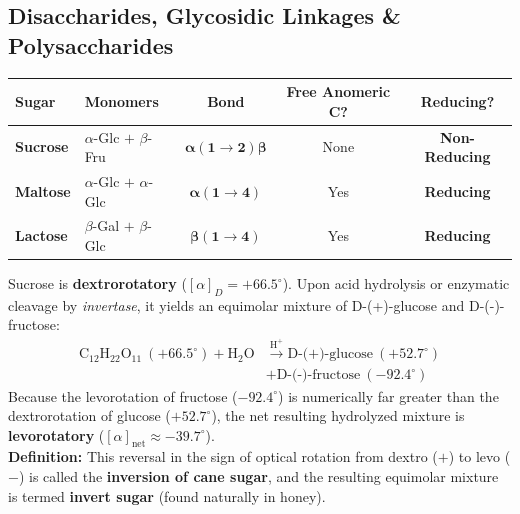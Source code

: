 \documentclass[10pt,twoside,openright]{book}
\begin{document}
\subsection{Disaccharides, Glycosidic Linkages \& Polysaccharides}

\begin{formulabox}
{\fontsize{7.5pt}{9.0pt}\selectfont\setlength{\tabcolsep}{1.5pt}
\begin{tabularx}{\linewidth}{l Y c c c}
\toprule
\textbf{Sugar} & \textbf{Monomers} & \textbf{Bond} & \textbf{Free Anomeric C?} & \textbf{Reducing?} \\
\midrule
\textbf{Sucrose} & $\alpha$-Glc $+$ $\beta$-Fru & $\mathbf{\alpha(1 \to 2)\beta}$ & None & \textbf{Non-Reducing} \\
\midrule
\textbf{Maltose} & $\alpha$-Glc $+$ $\alpha$-Glc & $\mathbf{\alpha(1 \to 4)}$ & Yes & \textbf{Reducing} \\
\midrule
\textbf{Lactose} & $\beta$-Gal $+$ $\beta$-Glc & $\mathbf{\beta(1 \to 4)}$ & Yes & \textbf{Reducing} \\
\bottomrule
\end{tabularx}}
\end{formulabox}

\begin{trapbox}
Sucrose is \textbf{dextrorotatory} ($[\alpha]_D = +66.5^\circ$). Upon acid hydrolysis or enzymatic cleavage by \textit{invertase}, it yields an equimolar mixture of D-(+)-glucose and D-(-)-fructose:
\begin{align}
  \mathrm{C_{12}H_{22}O_{11}} \ (+66.5^\circ) + \mathrm{H_2O} &\xrightarrow{\mathrm{H^+}} \mathrm{D\text{-(+)-glucose}} \ (+52.7^\circ) \\
  &+ \mathrm{D\text{-(-)-fructose}} \ (-92.4^\circ)
\end{align}
Because the levorotation of fructose ($-92.4^\circ$) is numerically far greater than the dextrorotation of glucose ($+52.7^\circ$), the net resulting hydrolyzed mixture is \textbf{levorotatory} ($[\alpha]_{\text{net}} \approx -39.7^\circ$).\\
\textbf{Definition:} This reversal in the sign of optical rotation from dextro ($+$) to levo ($-$) is called the \textbf{inversion of cane sugar}, and the resulting equimolar mixture is termed \textbf{invert sugar} (found naturally in honey).
\end{trapbox}
\end{document}
